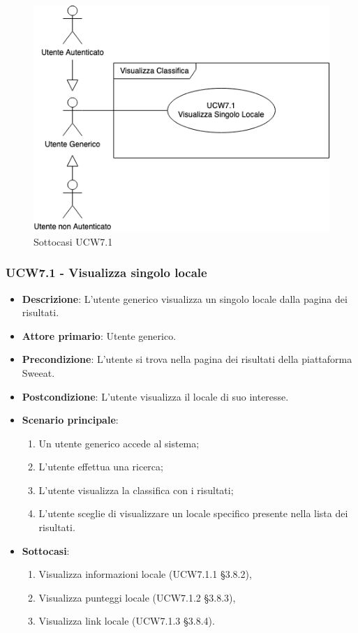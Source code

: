 \begin{figure}[H]
    \centering
        \includegraphics[scale=0.5]{UC_images/UCW7-x.png}
        \caption{Sottocasi UCW7.1}
\end{figure}

\subsubsection{UCW7.1 - Visualizza singolo locale}
\begin{itemize}
	\item \textbf{Descrizione}: L'utente generico visualizza un singolo locale dalla pagina dei risultati.
    \item \textbf{Attore primario}: Utente generico.
    \item \textbf{Precondizione}: L’utente si trova nella pagina dei risultati della piattaforma Sweeat.
    \item \textbf{Postcondizione}: L’utente visualizza il locale di suo interesse.
    \item \textbf{Scenario principale}: 
    \begin{enumerate}
        \item Un utente generico accede al sistema;
        \item L’utente effettua una ricerca;
        \item L'utente visualizza la classifica con i risultati;
        \item L'utente sceglie di visualizzare un locale specifico presente nella lista dei risultati.
    \end{enumerate}
	\item \textbf{Sottocasi}:
    \begin{enumerate}
	\item Visualizza informazioni locale (UCW7.1.1 \S{3.8.2}),
	\item Visualizza punteggi locale (UCW7.1.2 \S{3.8.3}), 
	\item Visualizza link locale (UCW7.1.3 \S{3.8.4}).	
	\end{enumerate}    
\end{itemize}

